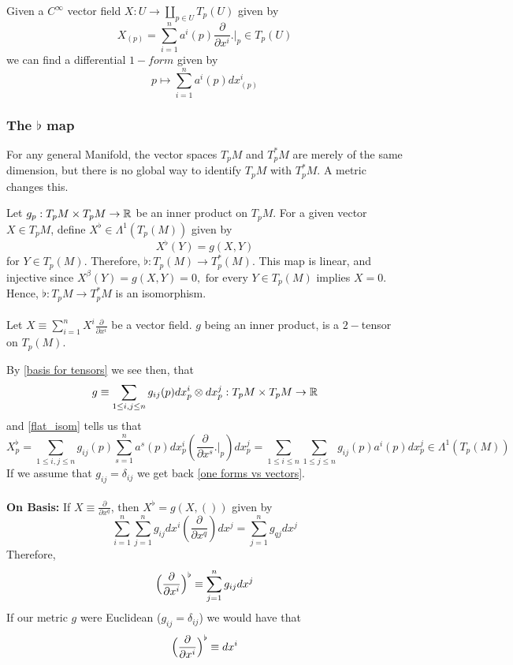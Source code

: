 Given a $C^{\infty}$ vector field $X:U\to \amalg_{p\in U} T_p(U)$ given by $$X_{(p)}=\sum_{i=1}^n a^i(p) \frac{\partial}{\partial x^i}\bigg.{|}_{p} \in T_p(U) $$ we can find a differential $1-form$ given by \begin{equation}\label{one forms vs vectors}p \mapsto \sum_{i=1}^n a^i(p) dx^i_{(p)}\end{equation}

\subsubsection{\label{section:flat_map}The $\flat$ map}
For any general Manifold, the vector spaces $T_pM$ and $T_p^*M$ are merely of the same dimension, but there is no global way to identify $T_pM$ with $T_p^*M$. A metric changes this. 

Let $g_p : T_p M \times T_p M \to \mathbb{R}$ be an inner product on $T_pM$. For a given vector $X \in T_pM$, define $X^{\flat}\in \Lambda^1(T_p(M))$ given by \begin{equation}\label{flat_isom}X^{\flat}(Y)=g(X,Y)\end{equation} for $Y\in T_p(M)$. Therefore, $\flat: T_p(M)\to T_p^*(M)$.
This map is linear, and injective since $X^{\beta}(Y)=g(X,Y)=0, \text{ for every }Y\in T_p(M)$ implies $X=0$. Hence, $\flat:T_pM\to T^*_pM$ is an isomorphism.
\\\\ Let $X\equiv \sum_{i=1}^n X^i \frac{\partial}{\partial x^i}$ be a vector field. $g$ being an inner product, is a $2-$tensor on $T_p(M)$.  

By \ref{basis for tensors} we see then, that $$g\equiv \sum_{1\leq i,j\leq n} g_{ij}(p) dx_p^i \otimes dx_p^j:T_pM\times T_pM\to \mathbb{R} $$ and \ref{flat_isom} tells us that $$X^{\flat}_{p}= \sum_{1\leq i,j\leq n}g_{ij}(p)\sum_{s=1}^na^s(p)dx^i_p( \frac{\partial}{\partial x^s}\bigg.{|}_p) dx^j_p = \sum_{1\leq i\leq n}\sum_{1\leq j\leq n} g_{ij}(p)a^i(p)dx^j_p \in \Lambda^{1}(T_p(M))$$
If we assume that $g_{ij}=\delta_{ij}$ we get back \ref{one forms vs vectors}.
\\\\ \textbf{On Basis:} If $X\equiv \frac{\partial}{\partial x^q}$, then $X^{\flat}= g(X,())$ given by $$\sum_{i=1}^n \sum_{j=1}^n g_{ij} dx^i(\frac{\partial}{\partial x^q})dx^j=\sum_{j=1}^n g_{qj}dx^j$$
Therefore, $$\Big{(}\frac{\partial}{\partial x^i}\Big{)}^{\flat}\equiv \sum_{j=1}^n g_{ij} dx^j $$
If our metric $g$ were Euclidean ($g_{ij}=\delta_{ij}$) we would have that $$\Big{(}\frac{\partial}{\partial x^i}\Big{)}^{\flat}\equiv dx^i $$


